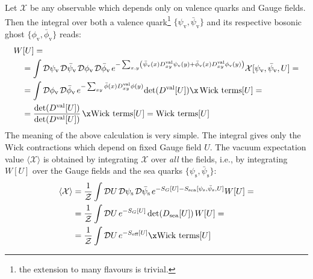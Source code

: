 \documentclass[english, LaM, oneside, noexaminfo]{sapthesis}
\newcommand{\la}{\langle}
\newcommand{\ra}{\rangle}
\begin{document}
Let $\mathcal{X}$ be any observable which depends only on valence quarks and Gauge fields.
Then the integral over both a valence quark\footnote{the extension to many flavours is trivial.} $\{\psi_\text{v},\bar\psi_\text{v}\}$ and its respective bosonic ghost $\{\phi_\text{v}, \bar\phi_\text{v} \}$ reads:
\begin{equation*}
    \begin{aligned}
        & W[U] = \\ 
        & \quad = \int \mathcal{D}\psi_\text{v} \hspace*{0.5mm} \mathcal{D}\bar\psi_\text{v} \hspace*{0.5mm} \mathcal{D}\phi_\text{v} \hspace*{0.5mm} \mathcal{D}\bar\phi_\text{v} \hspace*{0.5mm} e^{-\sum_{x,y} \left( \bar\psi_\text{v} (x) D^\text{val}_{xy} \psi_\text{v} (y) + \bar\phi_\text{v} (x) D^\text{val}_{xy} \phi_\text{v} (y) \right)} \mathcal{X}[\psi_\text{v},\bar\psi_\text{v},U] = \\
        & \quad = \int \mathcal{D}\phi_\text{v} \hspace*{0.5mm} \mathcal{D}\bar\phi_\text{v} \hspace*{0.5mm} e^{- \sum_{xy} \bar\phi (x) D^\text{val}_{xy} \phi (y)} \text{det}(D^\text{val}[U]) \x \hspace*{.5mm} \text{Wick terms}[U] = \\
        & \quad = \frac{\text{det}(D^\text{val}[U])}{\text{det}(D^\text{val}[U])}\hspace*{.5mm} \x \text{Wick terms}[U] = \text{Wick terms}[U]
    \end{aligned}
\end{equation*}
The meaning of the above calculation is very simple. The integral gives only the Wick contractions which depend on fixed Gauge field $U$.
The vacuum expectation value $\la\mathcal{X}\ra$ is obtained by integrating $\mathcal{X}$ over {\it all} the fields, i.e., by integrating $W[U]$ over the Gauge fields and the sea quarks $\{\psi_\text{s},\bar\psi_\text{s}\}$:
\begin{equation*}
    \begin{aligned}
        \la \mathcal{X} \ra
        & = \frac{1}{\mathcal{Z}} \int \mathcal{D}U \hspace*{.5mm} \mathcal{D}\psi_\text{s} \hspace*{0.5mm} \mathcal{D}\bar\psi_\text{s} \hspace*{.5mm} e^{-S_G[U]-S_\text{sea}[\psi_\text{s},\bar\psi_\text{s},U]} W[U] = \\
        & = \frac{1}{\mathcal{Z}} \int \mathcal{D}U \hspace*{.5mm} e^{-S_G[U]} \hspace*{.5mm} \text{det}(D_\text{sea}[U]) \hspace*{.5mm} W[U]= \\
        & = \frac{1}{\mathcal{Z}} \int \mathcal{D}U \hspace*{.5mm} e^{-S_\text{eff}[U]} \x \text{Wick terms}[U]
    \end{aligned}
\end{equation*}
\end{document}
